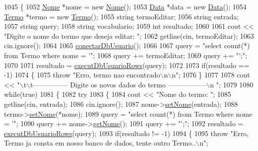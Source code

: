 \begin{DoxyCode}
1045 \{
1052   \mbox{\hyperlink{class_nome}{Nome}} *nome = \textcolor{keyword}{new} \mbox{\hyperlink{class_nome}{Nome}}();
1053   \mbox{\hyperlink{class_data}{Data}} *data = \textcolor{keyword}{new} \mbox{\hyperlink{class_data}{Data}}();
1054   \mbox{\hyperlink{class_termo}{Termo}} *termo = \textcolor{keyword}{new} \mbox{\hyperlink{class_termo}{Termo}}();
1055   \textcolor{keywordtype}{string} termoEditar;
1056   \textcolor{keywordtype}{string} entrada;
1057   \textcolor{keywordtype}{string} query;
1058   \textcolor{keywordtype}{string} vocabulario;
1059   \textcolor{keywordtype}{int} resultado;
1060 
1061   cout << \textcolor{stringliteral}{"Digite o nome do termo que deseja editar: "};
1062   getline(cin, termoEditar);
1063   cin.ignore();
1064 
1065   \mbox{\hyperlink{comando_sql_8cpp_a4f89ddcbc4cf8f2587d89f72f8c7900d}{conectarDbUsuario}}();
1066 
1067   query = \textcolor{stringliteral}{"select count(*) from Termo where nome = '"};
1068   query += termoEditar;
1069   query += \textcolor{stringliteral}{"';"};
1070 
1071   resultado = \mbox{\hyperlink{comando_sql_8cpp_af54952694f2fa7d76f969fb74b853cb9}{executDbUsuarioRows}}(query);
1072 
1073   \textcolor{keywordflow}{if}(resultado == -1)
1074   \{
1075     \textcolor{keywordflow}{throw} \textcolor{stringliteral}{"Erro, termo nao encontrado\(\backslash\)n\(\backslash\)n"};
1076   \}
1077 
1078   cout << \textcolor{stringliteral}{"\(\backslash\)t\(\backslash\)t--------------- Digite os novos dados do termo -----------------\(\backslash\)n "};
1079 
1080   \textcolor{keywordflow}{while}(\textcolor{keyword}{true})
1081   \{
1082     \textcolor{keywordflow}{try}
1083     \{
1084       cout << \textcolor{stringliteral}{"Nome do termo: "};
1085       getline(cin, entrada);
1086       cin.ignore();
1087       nome->\mbox{\hyperlink{class_nome_a83b9f56ec9f86f4b976846f4c5c65b30}{setNome}}(entrada);
1088       termo->\mbox{\hyperlink{class_termo_a43246196cccd6fa074731e93ac15f07a}{setNome}}(*nome);
1089       query = \textcolor{stringliteral}{"select count(*) from Termo where nome = '"};
1090       query += nome->\mbox{\hyperlink{class_nome_aad41176173eec20cbbae1576447a3697}{getNome}}();
1091       query += \textcolor{stringliteral}{"';"};
1092       resultado = \mbox{\hyperlink{comando_sql_8cpp_af54952694f2fa7d76f969fb74b853cb9}{executDbUsuarioRows}}(query);
1093       \textcolor{keywordflow}{if}(resultado != -1)
1094       \{
1095         \textcolor{keywordflow}{throw} \textcolor{stringliteral}{"Erro, Termo ja consta em nosso banco de dados, tente outro Termo..\(\backslash\)n"};

\end{DoxyCode}
